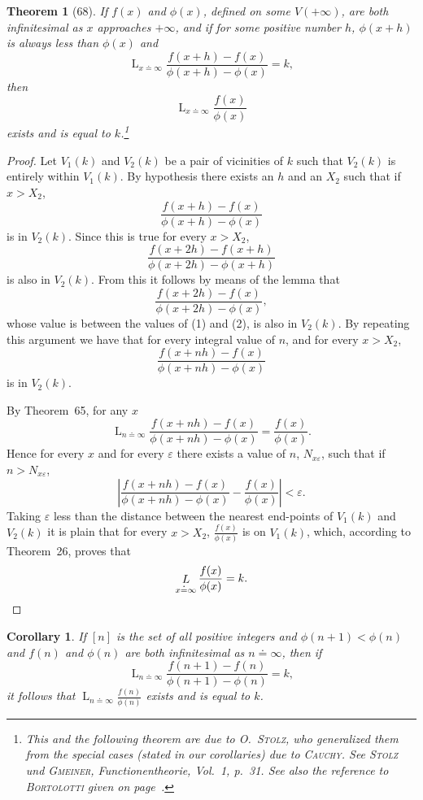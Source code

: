 \documentclass[a4paper,12pt]{book}[2004/02/16]
\providecommand{\hyperlink}[2]{#2}
\providecommand{\hypertarget}[2]{#2}
\theoremstyle{ilemma}
\theoremstyle{itheorem}
\newtheorem{theorem}{Theorem}
\theoremstyle{iother}
\theoremstyle{icorollary}
\newtheorem{corollary}{Corollary}
\theoremstyle{numcorollary}
\theoremstyle{idefinition}
\renewcommand{\dfrac}[2]{\frac{#1}{#2}}%
\begin{document}
\begin{theorem}[68]\hypertarget{thm68}{}
If $f(x)$ and $\phi(x)$, defined on some $V(+\infty)$, are both
infinitesimal as $x$ approaches $+\infty$, and if for some positive
number $h$, $\phi(x+h)$ is always less than $\phi(x)$ and
\[
  \mathop{L}_{x\doteq\infty} \frac{f(x+h)-f(x)}{\phi(x+h)-\phi(x)}=k,
\]
then
\[
  \mathop{L}_{x\doteq\infty} \frac{f(x)}{\phi(x)}
\]
exists and is equal to $k$.\footnote{%
  This and the following theorem are due to \textsc{O.~Stolz}, who
  generalized them from the special cases (stated in our corollaries)
  due to \textsc{Cauchy}. See \textsc{Stolz} und \textsc{Gmeiner},
  Functionentheorie, Vol.~1, p.~31. See also the reference to
  \textsc{Bortolotti} given on page~\pageref{borlottip103}.}
\end{theorem}

\begin{proof}
Let $V_1(k)$ and $V_2(k)$ be a pair of vicinities of $k$ such that
$V_2(k)$ is entirely within $V_1(k)$. By hypothesis there exists an
$h$ and an $X_2$ such that if $x>X_2$,
\hypertarget{eq1p109}{\[
  \frac{f(x+h)-f(x)}{\phi(x+h)-\phi(x)} \tag{1}
\]}
is in $V_2(k)$. Since this is true for every $x>X_2$,
\hypertarget{eq2p109}{\[
  \frac{f(x+2h)-f(x+h)}{\phi(x+2h)-\phi(x+h)}\tag{2}
\]}
is also in $V_2(k)$. From this it follows by means of the lemma that
\[
  \frac{f(x+2h)-f(x)}{\phi(x+2h)-\phi(x)},\tag{3}
\]
whose value is between the values of \hyperlink{eq1p109}{(1)} and \hyperlink{eq2p109}{(2)}, is also in $V_2(k)$.
By repeating this argument we have that for every integral value of
$n$, and for every $x>X_2$,
\[
  \frac{f(x+nh)-f(x)}{\phi(x+nh)-\phi(x)}
\]
is in $V_2(k)$.

By Theorem~\hyperlink{thm65}{65}, for any $x$
\[
  \mathop{L}_{n\doteq\infty} \frac{f(x+nh)-f(x)}{\phi(x+nh)-\phi(x)}
  = \frac{f(x)}{\phi(x)}.
\]
Hence for every $x$ and for every $\varepsilon$ there exists a value
of $n$, $N_{x\varepsilon}$, such that if $n>N_{x\varepsilon}$,
\[
  \left| \frac{f(x+nh)-f(x)}{\phi(x+nh)-\phi(x)}-\frac{f(x)}{\phi(x)} \right| < \varepsilon.
\]
Taking $\varepsilon$ less than the distance between the nearest
end-points of $V_1(k)$ and $V_2(k)$ it is plain that for every
$x>X_2$, $\dfrac{f(x)}{\phi(x)}$ is
on $V_1(k)$, which, according to Theorem~\hyperlink{thm26}{26}, proves that
\[
  \mathop{L}_{x\doteq\infty} \frac{f(x)}{\phi(x)} = k.\qedhere
\]
\end{proof}
\begin{corollary}
If $[n]$ is the set of all positive integers and $\phi(n+1)<\phi(n)$
and $f(n)$ and $\phi(n)$ are both infinitesimal as $n\doteq\infty$,
then if
\[
  \mathop{L}_{n\doteq\infty} \frac{f(n+1)-f(n)}{\phi(n+1)-\phi(n)} =k,
\]
it follows that $\displaystyle \mathop{L}_{n\doteq\infty}
\dfrac{f(n)}{\phi(n)}$ exists and is equal to $k$.
\end{corollary}
\end{document}
